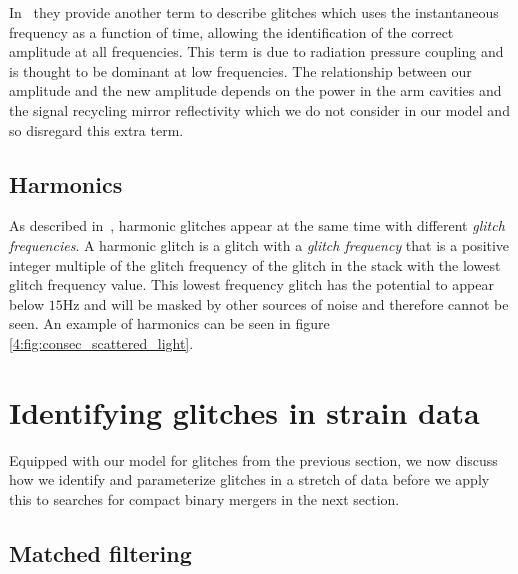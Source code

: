 In~\cite{Was_Subtract:2021} they provide another term to describe \scl{} glitches which uses the instantaneous frequency as a function of time, allowing the identification of the correct amplitude at all frequencies. This term is due to radiation pressure coupling and is thought to be dominant at low frequencies. The relationship between our amplitude and the new amplitude depends on the power in the arm cavities and the signal recycling mirror reflectivity which we do not consider in our model and so disregard this extra term.

\subsection{Harmonics}

As described in~\cite{TAccadia:2010}, harmonic glitches appear at the same time with different \emph{glitch frequencies}. A harmonic glitch is a glitch with a \emph{glitch frequency} that is a positive integer multiple of the glitch frequency of the glitch in the stack with the lowest glitch frequency value. This lowest frequency glitch has the potential to appear below $15$Hz and will be masked by other sources of noise and therefore cannot be seen. An example of harmonics can be seen in figure \ref{4:fig:consec_scattered_light}.

\section{\label{4:sec:search_techniques}Identifying \scl{} glitches in \gw{} strain data}

Equipped with our model for \scl{} glitches from the previous section, we now discuss how we identify and parameterize \scl{} glitches in a stretch of \gw{} data before we apply this to searches for compact binary mergers in the next section. 

\subsection{\label{4:subsec:MF}Matched filtering}

